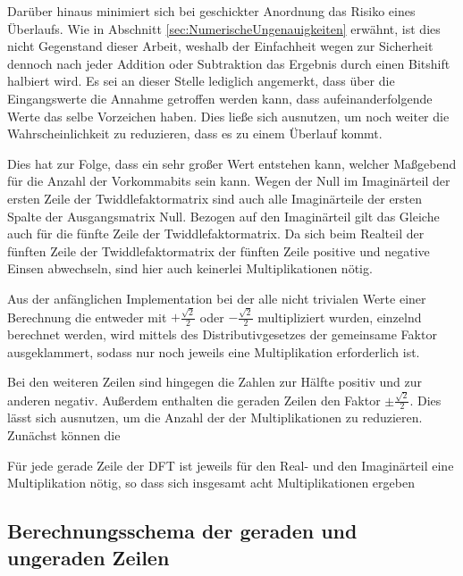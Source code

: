  
 Darüber hinaus
 minimiert sich bei geschickter Anordnung das Risiko eines Überlaufs. Wie in Abschnitt \ref{sec:NumerischeUngenauigkeiten} erwähnt, ist dies nicht Gegenstand dieser Arbeit,
 weshalb der Einfachheit wegen zur Sicherheit dennoch nach jeder Addition oder Subtraktion das Ergebnis durch einen Bitshift halbiert wird. 
 Es sei an dieser Stelle lediglich angemerkt, dass über die Eingangswerte die Annahme getroffen werden kann, dass aufeinanderfolgende Werte das selbe Vorzeichen haben. 
 Dies ließe sich ausnutzen, um noch weiter die Wahrscheinlichkeit zu reduzieren, dass es zu einem Überlauf kommt. 
 


Dies hat zur Folge, dass ein sehr großer Wert entstehen kann, welcher Maßgebend für die Anzahl der Vorkommabits sein kann.
%
Wegen der Null im Imaginärteil der ersten Zeile der Twiddlefaktormatrix sind auch alle Imaginärteile der ersten Spalte der Ausgangsmatrix Null.
Bezogen auf den Imaginärteil gilt das Gleiche auch für die fünfte Zeile der Twiddlefaktormatrix. 
%
Da sich beim Realteil der fünften Zeile der Twiddlefaktormatrix der fünften Zeile positive und negative Einsen abwechseln, sind hier auch keinerlei Multiplikationen nötig.

Aus der anfänglichen Implementation bei der alle nicht trivialen Werte einer Berechnung die entweder mit $+\frac{\sqrt{2}}{2}$ oder $-\frac{\sqrt{2}}{2}$ multipliziert wurden,
einzelnd berechnet werden, wird mittels des Distributivgesetzes der gemeinsame Faktor ausgeklammert, sodass nur noch jeweils eine Multiplikation erforderlich ist.


Bei den weiteren Zeilen sind hingegen die Zahlen zur Hälfte positiv und zur anderen negativ. Außerdem enthalten die geraden Zeilen den Faktor $\pm\frac{\sqrt{2}}{2}$. 
Dies lässt sich ausnutzen, um die Anzahl der der Multiplikationen zu reduzieren. Zunächst können die 

Für jede gerade Zeile der DFT ist jeweils für den Real- und den Imaginärteil eine Multiplikation nötig, so dass sich insgesamt acht Multiplikationen ergeben
 




 
 
\subsection{Berechnungsschema der geraden und ungeraden Zeilen}\label{sec:Berechnungsschema}

